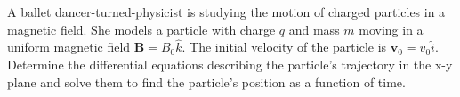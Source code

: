 \documentclass[border=10pt]{standalone}
\begin{document}
\begin{tcolorbox}[
    enhanced,
    colback=questionbg,
    colframe=questionborder,
    arc=8pt,
    boxrule=1.5pt,
    fontupper=\large\sffamily,
    drop fuzzy shadow=questionborder
]
A ballet dancer-turned-physicist is studying the motion of charged particles in a magnetic field. She models a particle with charge $q$ and mass $m$ moving in a uniform magnetic field $\mathbf{B} = B_0\hat{k}$. The initial velocity of the particle is $\mathbf{v}_0 = v_0\hat{i}$. Determine the differential equations describing the particle's trajectory in the x-y plane and solve them to find the particle's position as a function of time.
\end{tcolorbox}
\end{document}
